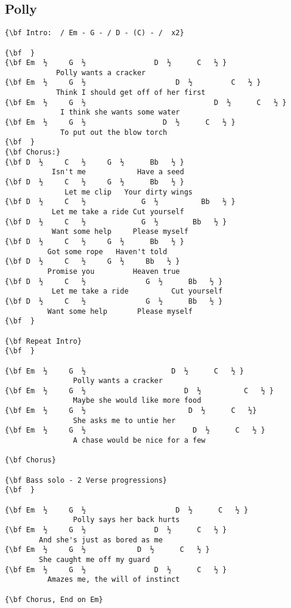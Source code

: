 \documentclass[a4paper]{article}
\begin{document}
\subsection{Polly} %
\label{sub:Polly}
\begin{Verbatim}[commandchars=\\\{\}]
{\bf Intro:  / Em - G - / D - (C) - /  x2}

{\bf  }
{\bf Em  ½     G  ½                D  ½      C   ½ }
            Polly wants a cracker
{\bf Em  ½     G  ½                     D  ½         C   ½ }
            Think I should get off of her first
{\bf Em  ½     G  ½                              D  ½      C   ½ }
             I think she wants some water
{\bf Em  ½     G  ½                  D  ½      C   ½ }
             To put out the blow torch
{\bf  }
{\bf Chorus:}
{\bf D  ½     C   ½     G  ½      Bb   ½ }
           Isn't me            Have a seed
{\bf D  ½     C   ½     G  ½      Bb   ½ }
              Let me clip   Your dirty wings
{\bf D  ½     C   ½             G  ½          Bb   ½ }
           Let me take a ride Cut yourself
{\bf D  ½     C   ½             G  ½        Bb   ½ }
           Want some help     Please myself
{\bf D  ½     C   ½     G  ½      Bb   ½ }
          Got some rope   Haven't told
{\bf D  ½     C   ½     G  ½     Bb   ½ }
          Promise you         Heaven true
{\bf D  ½     C   ½              G  ½      Bb   ½ }
           Let me take a ride          Cut yourself
{\bf D  ½     C   ½              G  ½      Bb   ½ }
          Want some help       Please myself
{\bf  }

{\bf Repeat Intro}
{\bf  }

{\bf Em  ½     G  ½                    D  ½      C   ½ }
                Polly wants a cracker
{\bf Em  ½     G  ½                       D  ½          C   ½ }
                Maybe she would like more food
{\bf Em  ½     G  ½                        D  ½      C   ½}
                She asks me to untie her
{\bf Em  ½     G  ½                         D  ½      C   ½ }
                A chase would be nice for a few

{\bf Chorus}

{\bf Bass solo - 2 Verse progressions}
{\bf  }

{\bf Em  ½     G  ½                     D  ½      C   ½ }
                Polly says her back hurts
{\bf Em  ½     G  ½                D  ½      C   ½ }
        And she's just as bored as me
{\bf Em  ½     G  ½            D  ½      C   ½ }
        She caught me off my guard
{\bf Em  ½     G  ½                D  ½      C   ½ }
          Amazes me, the will of instinct

{\bf Chorus, End on Em}
\end{Verbatim}
\newpage
\end{document}
